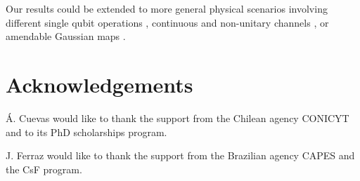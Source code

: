 \documentclass[aps,twocolumn,pra,superscriptaddress,showpacs,showkeys,floatfix]{revtex4-1}
\begin{document}
Our results could be extended to more general physical scenarios involving different single qubit operations \cite{depasquale2012}, continuous and non-unitary channels \cite{cutandpaste}, or amendable Gaussian maps \cite{depasquale2013}.


\section{Acknowledgements}
\'A. Cuevas would like to thank the support from the Chilean agency CONICYT and to its PhD scholarships program.

J. Ferraz would like to thank the support from the Brazilian agency CAPES and the CsF program. 

\begin{thebibliography}{99}


\end{thebibliography}
\end{document}

